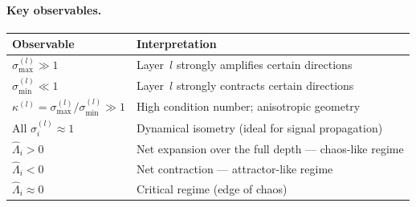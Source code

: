 \documentclass[11pt]{article}
\begin{document}
\paragraph{Key observables.}
\begin{center}
\begin{tabular}{ll}
\toprule
\textbf{Observable} & \textbf{Interpretation} \\
\midrule
$\sigma_{\max}^{(l)} \gg 1$
    & Layer~$l$ strongly amplifies certain directions \\
$\sigma_{\min}^{(l)} \ll 1$
    & Layer~$l$ strongly contracts certain directions \\
$\kappa^{(l)} = \sigma_{\max}^{(l)} / \sigma_{\min}^{(l)} \gg 1$
    & High condition number; anisotropic geometry \\
All $\sigma_i^{(l)} \approx 1$
    & Dynamical isometry (ideal for signal propagation) \\
$\hat\Lambda_i > 0$
    & Net expansion over the full depth --- chaos-like regime \\
$\hat\Lambda_i < 0$
    & Net contraction --- attractor-like regime \\
$\hat\Lambda_i \approx 0$
    & Critical regime (edge of chaos) \\
\bottomrule
\end{tabular}
\end{center}
\end{document}
